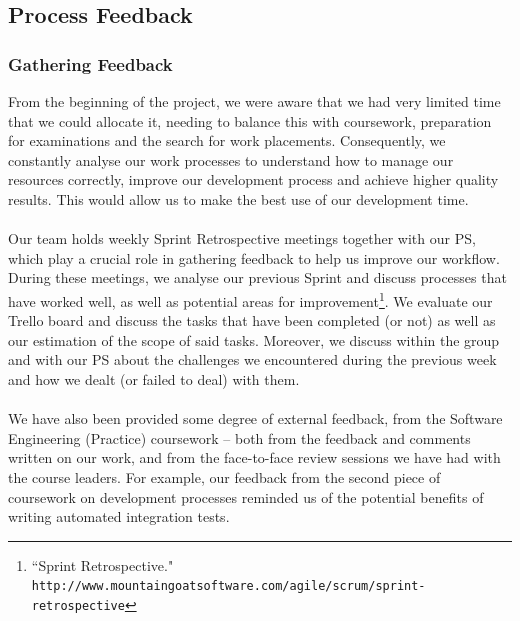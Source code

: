 \documentclass[a4paper, 10pt]{article}
\begin{document}
\subsection{Process Feedback}
\subsubsection{Gathering Feedback}
From the beginning of the project, we were aware that we had very limited time that we could allocate it, needing to balance this with coursework, preparation for examinations and the search for work placements. Consequently, we constantly analyse our work processes to understand how to manage our resources correctly, improve our development process and achieve higher quality results. This would allow us to make the best use of our development time. \\\\
Our team holds weekly Sprint Retrospective meetings together with our PS, which play a crucial role in gathering feedback to help us improve our workflow. During these meetings, we analyse our previous Sprint and discuss processes that have worked well, as well as potential areas for improvement\footnote{``Sprint Retrospective." \texttt{http://www.mountaingoatsoftware.com/agile/scrum/sprint-retrospective}}. We evaluate our Trello board and discuss the tasks that have been completed (or not) as well as our estimation of the scope of said tasks. Moreover, we discuss within the group and with our PS about the challenges we encountered during the previous week and how we dealt (or failed to deal) with them. \\\\
We have also been provided some degree of external feedback, from the Software Engineering (Practice) coursework -- both from the feedback and comments written on our work, and from the face-to-face review sessions we have had with the course leaders. For example, our feedback from the second piece of coursework on development processes reminded us of the potential benefits of writing automated integration tests.
\end{document}
